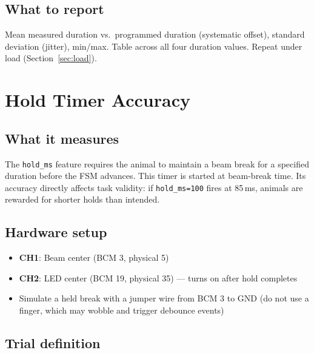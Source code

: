 \documentclass[11pt, a4paper]{article}
\begin{document}
\subsection*{What to report}

Mean measured duration vs.\ programmed duration (systematic offset), standard
deviation (jitter), min/max. Table across all four duration values.
Repeat under load (Section~\ref{sec:load}).

\newpage

\section{Hold Timer Accuracy}

\subsection*{What it measures}

The \texttt{hold\_ms} feature requires the animal to maintain a beam break for
a specified duration before the FSM advances. This timer is started at
beam-break time. Its accuracy directly affects task validity: if
\texttt{hold\_ms=100} fires at 85\,ms, animals are rewarded for shorter holds
than intended.

\subsection*{Hardware setup}

\begin{itemize}[noitemsep]
    \item \textbf{CH1}: Beam center (BCM 3, physical 5)
    \item \textbf{CH2}: LED center (BCM 19, physical 35) --- turns on after hold completes
    \item Simulate a held break with a jumper wire from BCM 3 to GND (do not
          use a finger, which may wobble and trigger debounce events)
\end{itemize}

\subsection*{Trial definition}
\end{document}
